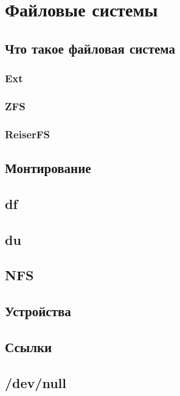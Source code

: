 \section{Файловые системы}
\subsection{Что такое файловая система}
\subsubsection{Ext}
\subsubsection{ZFS}
\subsubsection{ReiserFS}
\subsection{Монтирование}
\subsection{df}
\subsection{du}
\subsection{NFS}
\subsection{Устройства}
\subsection{Ссылки}
\subsection{/dev/null}



\newpage
